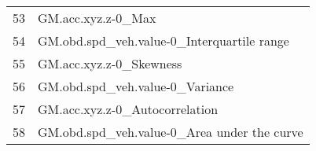 \begin{tabular}{ll}
53 &                                GM.acc.xyz.z-0\_Max \\
54 &        GM.obd.spd\_veh.value-0\_Interquartile range \\
55 &                           GM.acc.xyz.z-0\_Skewness \\
56 &                   GM.obd.spd\_veh.value-0\_Variance \\
57 &                    GM.acc.xyz.z-0\_Autocorrelation \\
58 &       GM.obd.spd\_veh.value-0\_Area under the curve \\
\bottomrule
\end{tabular}

